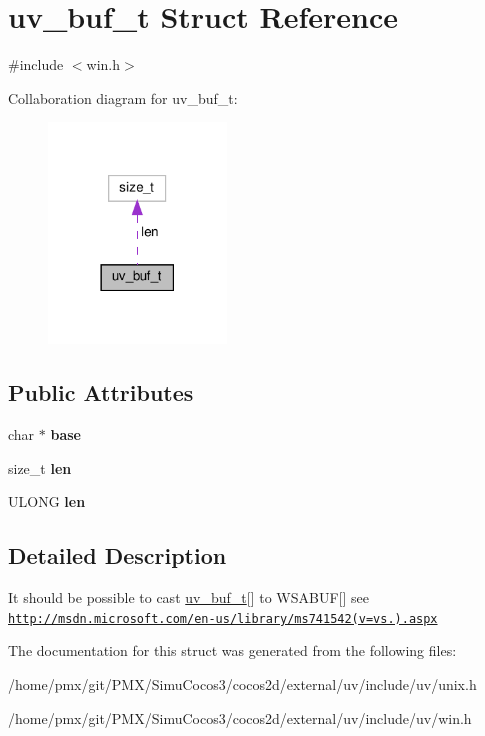 \hypertarget{structuv__buf__t}{}\section{uv\+\_\+buf\+\_\+t Struct Reference}
\label{structuv__buf__t}


{\ttfamily \#include $<$win.\+h$>$}



Collaboration diagram for uv\+\_\+buf\+\_\+t\+:
\nopagebreak
\begin{figure}[H]
\begin{center}
\leavevmode
\includegraphics[width=134pt]{structuv__buf__t__coll__graph}
\end{center}
\end{figure}
\subsection*{Public Attributes}
\begin{DoxyCompactItemize}
\item 
\mbox{\label{structuv__buf__t_a40bb714f0ca47b0d0913caf0fd4df44e}} 
char $\ast$ {\bfseries base}
\item 
\mbox{\label{structuv__buf__t_a1f258533d380bfb77f226e03f590388d}} 
size\+\_\+t {\bfseries len}
\item 
\mbox{\label{structuv__buf__t_a5d3d6966184032a0b0357d02055716af}} 
U\+L\+O\+NG {\bfseries len}
\end{DoxyCompactItemize}


\subsection{Detailed Description}
It should be possible to cast \hyperlink{structuv__buf__t}{uv\+\_\+buf\+\_\+t}\mbox{[}\mbox{]} to W\+S\+A\+B\+UF\mbox{[}\mbox{]} see \href{http://msdn.microsoft.com/en-us/library/ms741542(v=vs.85).aspx}{\tt http\+://msdn.\+microsoft.\+com/en-\/us/library/ms741542(v=vs.).\+aspx} 

The documentation for this struct was generated from the following files\+:\begin{DoxyCompactItemize}
\item 
/home/pmx/git/\+P\+M\+X/\+Simu\+Cocos3/cocos2d/external/uv/include/uv/unix.\+h\item 
/home/pmx/git/\+P\+M\+X/\+Simu\+Cocos3/cocos2d/external/uv/include/uv/win.\+h\end{DoxyCompactItemize}
